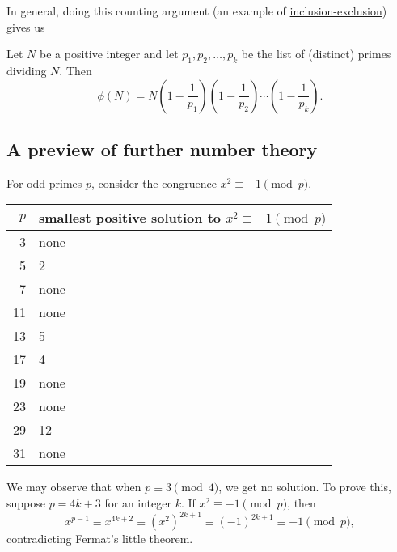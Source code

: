 In general, doing this counting argument (an example of \href{https://en.wikipedia.org/wiki/Inclusion%E2%80%93exclusion_principle}{inclusion-exclusion}) gives us
\begin{theorem}
Let $N$ be a positive integer and let $p_1, p_2, \ldots, p_k$ be the list of (distinct) primes dividing $N$. Then
\begin{equation*}
\phi(N) = N\left(1 - \frac{1}{p_1}\right)\left(1 - \frac{1}{p_2}\right)\cdots\left(1 - \frac{1}{p_k}\right).
\end{equation*}
\end{theorem}


\subsection{A preview of further number theory}

For odd primes $p$, consider the congruence $x^2\equiv -1\pmod{p}$.
\begin{center}
\begin{tabular}{r|l}
$p$ & smallest positive solution to $x^2\equiv -1\pmod{p}$ \\ \hline
3 & none \\
5 & 2 \\
7 & none \\
11 & none \\
13 & 5 \\
17 & 4 \\
19 & none \\
23 & none \\
29 & 12 \\
31 & none
\end{tabular}
\end{center}
We may observe that when $p\equiv 3\pmod{4}$, we get no solution. To prove this, suppose $p = 4k + 3$ for an integer $k$. If $x^2\equiv -1\pmod{p}$, then
\begin{equation*}
x^{p - 1}\equiv x^{4k + 2}\equiv (x^2)^{2k + 1}\equiv (-1)^{2k + 1}\equiv -1\pmod{p},
\end{equation*}
contradicting Fermat's little theorem.

